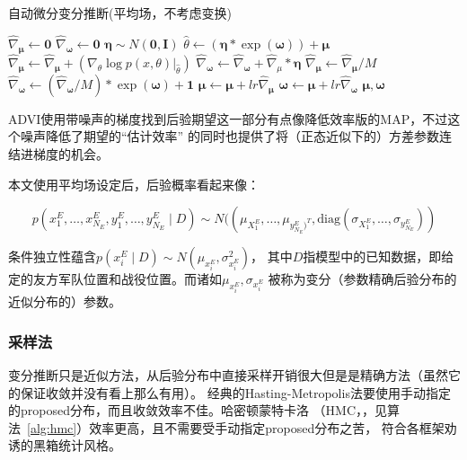 \documentclass{sicnuthesis}
\begin{document}
\begin{algorithm}
\caption{自动微分变分推断(平均场，不考虑变换)}
\begin{algorithmic}[1]
  
        \State $\hat{\nabla}_\mathbf{\mu} \gets \mathbf{0}$
        \State $\hat{\nabla}_\mathbf{\omega} \gets \mathbf{0}$
            \State $\mathbf{\eta} \sim N(\mathbf{0},\mathbf{I}) $ 
            \State $\hat{\theta} \gets (\mathbf{\eta} * \exp(\mathbf{\omega})) + \mathbf{\mu}$ 
            \State $\hat{\nabla}_\mathbf{\mu} \gets \hat{\nabla}_\mathbf{\mu} + (\nabla_\theta \log p(x,\theta)|_{\hat{\theta}})$
            \State $\hat{\nabla}_\mathbf{\omega} \gets \hat{\nabla}_\mathbf{\omega} + \hat{\nabla}_\mu * \mathbf{\eta}$
        \EndFor
        \State $\hat{\nabla}_{\mathbf{\mu}} \gets \hat{\nabla}_{\mathbf{\mu}} / M$
        \State $\hat{\nabla}_{\mathbf{\omega}} \gets (\hat{\nabla}_\mathbf{\omega} / M) * \exp(\mathbf{\omega}) + \mathbf{1}$
        \State $\mathbf{\mu} \gets \mathbf{\mu} + lr \hat{\nabla}_{\mathbf{\mu}}$
        \State $\mathbf{\omega} \gets \mathbf{\mu} + lr \hat{\nabla}_{\mathbf{\omega}}$
    \EndFor 
    \State \Return $\mathbf{\mu},\mathbf{\omega}$
\EndProcedure
\end{algorithmic}
\label{alg:advi}
\end{algorithm}


ADVI使用带噪声的梯度找到后验期望这一部分有点像降低效率版的MAP，不过这个噪声降低了期望的“估计效率”
的同时也提供了将（正态近似下的）方差参数连结进梯度的机会。

本文使用平均场设定后，后验概率看起来像：

$$
p(x^E_1,\dots,x^E_{N_E},y^E_1,\dots,y^E_{N_E} \mid D) \sim 
N((\mu_{X^E_1},\dots,\mu_{y^E_{N_E})^T},\mathrm{diag}(\sigma_{X^E_1},\dots,\sigma_{y^E_{N_E}}))
$$


条件独立性蕴含$p(x^E_i \mid D) \sim N(\mu_{x^E_i},\sigma_{x^E_i}^2)$，
其中$D$指模型中的已知数据，即给定的友方军队位置和战役位置。而诸如$\mu_{x^E_i},\sigma_{x^E_i}$
被称为变分（参数精确后验分布的近似分布的）参数。

\subsubsection{采样法}


变分推断只是近似方法，从后验分布中直接采样开销很大但是是精确方法（虽然它的保证收敛并没有看上那么有用）。
经典的Hasting-Metropolis法要使用手动指定的proposed分布，而且收敛效率不佳。哈密顿蒙特卡洛
（HMC，\cite{hoffman2014no}，见算法~\ref{alg:hmc}）效率更高，且不需要受手动指定proposed分布之苦，
符合各框架劝诱的黑箱统计风格。
\end{document}
